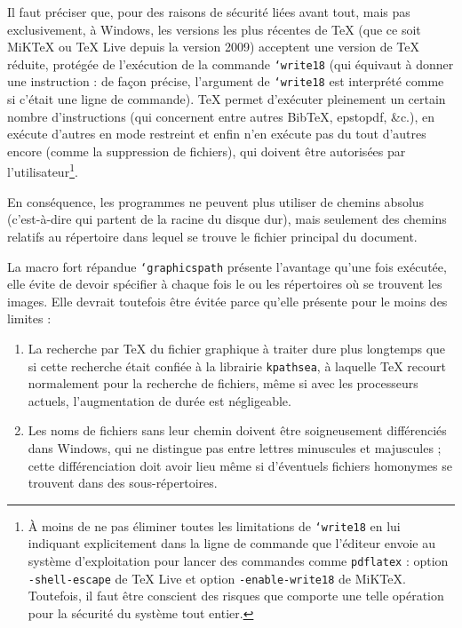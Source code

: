 \documentclass[fontsize=11pt, paper=a4, pagesize, captions=tableheading, numbers=enddot, toc=graduated, footnotes=multiple]{scrartcl}%
\DeclareRobustCommand*{\Macro}[1]{\mbox{\texttt{\char`\\#1}}}
\begin{document}

Il faut préciser que, pour des raisons de sécurité liées avant tout, mais pas exclusivement, à Windows, les versions les plus récentes de \TeX{} (que ce soit MiKTeX ou TeX Live depuis la version 2009) acceptent une version de \TeX{} réduite, protégée de l’exécution de la commande \Macro{write18} (qui équivaut à donner une instruction : de façon précise, l’argument de \Macro{write18} est interprété comme si c’était une ligne de commande). \TeX{} permet d’exécuter pleinement un certain nombre d’instructions (qui concernent entre autres Bib\TeX{}, epstopdf, \&c.), en exécute d’autres en mode restreint et enfin n’en exécute pas du tout d’autres encore (comme la suppression de fichiers), qui doivent être autorisées par l’utilisateur\footnote{À moins de ne pas éliminer toutes les limitations de \Macro{write18} en lui indiquant explicitement dans la ligne de commande que l’éditeur envoie au système d’exploitation pour lancer des commandes comme \texttt{pdflatex} : option \texttt{-shell-escape} de TeX Live et option \texttt{-enable-write18} de MiKTeX. Toutefois, il faut être conscient des risques que comporte une telle opération pour la sécurité du système tout entier. }.

En conséquence, les programmes ne peuvent plus utiliser de chemins absolus (c’est-à-dire qui partent de la racine du disque dur), mais seulement des chemins relatifs au répertoire dans lequel se trouve le fichier principal du document.

La macro fort répandue \Macro{graphicspath} présente l’avantage qu’une fois exécutée, elle évite de devoir spécifier à chaque fois le ou les répertoires où se trouvent les images. Elle devrait toutefois être évitée parce qu’elle présente pour le moins des limites :

\begin{enumerate}
\item La recherche par \TeX{} du fichier graphique à traiter dure plus longtemps que si cette recherche était confiée à la librairie \texttt{kpathsea}, à laquelle \TeX{} recourt normalement pour la recherche de fichiers, même si avec les processeurs actuels, l’augmentation de durée est négligeable.

\item Les noms de fichiers sans leur chemin doivent être soigneusement différenciés dans Windows, qui ne distingue pas entre lettres minuscules et majuscules ; cette différenciation doit avoir lieu même si d’éventuels fichiers homonymes se trouvent dans des sous-répertoires.
\end{enumerate}
\end{document}
